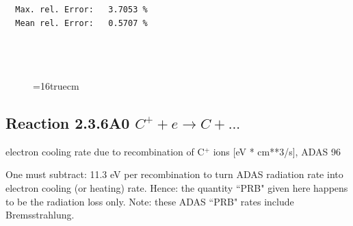 \documentclass[12pt,dvips]{article}
\begin{document}
\begin{small}
\begin{verbatim}
  Max. rel. Error:   3.7053 %
  Mean rel. Error:   0.5707 %




\end{verbatim}\end{small}
\begin{figure} \label{2.8il}
\epsfxsize=16truecm 
\end{figure}
\newpage

\subsection{
  Reaction 2.3.6A0  $C^+ + e \rightarrow C   + ... $
}
electron cooling rate due to recombination of C$^+$ ions [eV * cm**3/s],
ADAS 96

One must subtract: 11.3 eV per recombination to turn ADAS radiation
rate into electron cooling (or heating) rate. Hence: the quantity
``PRB" given here happens to be the radiation loss only. Note: these
ADAS ``PRB" rates include Bremsstrahlung.
\end{document}
